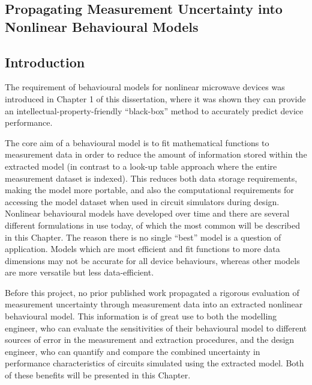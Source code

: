 \documentclass[../thesis/thesis.tex]{subfiles}
\begin{document}
	
\onlyinsubfile{\setcounter{chapter}{4}}

\begin{refsection}
\chapter[Prop. Meas. Unc. To Nonlinear Behavioural Models]{Propagating Measurement Uncertainty into Nonlinear Behavioural Models}
\section{Introduction}

The requirement of behavioural models for nonlinear microwave devices was introduced in Chapter 1 of this dissertation, where it was shown they can provide an intellectual-property-friendly ``black-box'' method to accurately predict device performance.

The core aim of a behavioural model is to fit mathematical functions to measurement data in order to reduce the amount of information stored within the extracted model (in contrast to a look-up table approach where the entire measurement dataset is indexed). This reduces both data storage requirements, making the model more portable, and also the computational requirements for accessing the model dataset when used in circuit simulators during design. Nonlinear behavioural models have developed over time and there are several different formulations in use today, of which the most common will be described in this Chapter. The reason there is no single ``best'' model is a question of application. Models which are most efficient and fit functions to more data dimensions may not be accurate for all device behaviours, whereas other models are more versatile but less data-efficient.

Before this project, no prior published work propagated a rigorous evaluation of measurement uncertainty through measurement data into an extracted nonlinear behavioural model. This information is of great use to both the modelling engineer, who can evaluate the sensitivities of their behavioural model to different sources of error in the measurement and extraction procedures, and the design engineer, who can quantify and compare the combined uncertainty in performance characteristics of circuits simulated using the extracted model. Both of these benefits will be presented in this Chapter.



\end{refsection}
\end{document}
